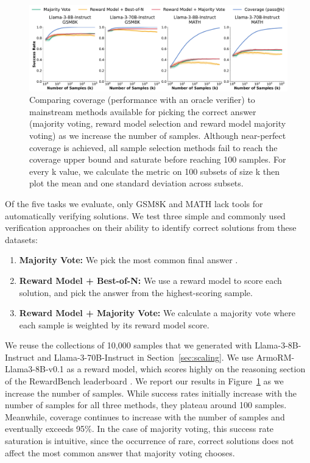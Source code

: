 \documentclass[11pt]{article}
\begin{document}
\begin{figure}
    \centering
    \includegraphics[width=\textwidth]{figures/pass_ats.pdf}
    \caption{Comparing coverage (performance with an oracle verifier) to mainstream methods available for picking the correct answer (majority voting, reward model selection and reward model majority voting) as we increase the number of samples. Although near-perfect coverage is achieved, all sample selection methods fail to reach the coverage upper bound and saturate before reaching 100 samples. For every k value, we calculate the metric on 100 subsets of size k then plot the mean and one standard deviation across subsets.}
    \label{fig:precision_methods}
\end{figure}


Of the five tasks we evaluate, only GSM8K and MATH lack tools for automatically verifying solutions. We test three simple and commonly used verification approaches on their ability to identify correct solutions from these datasets:

\begin{enumerate}
    \item \textbf{Majority Vote:} We pick the most common final answer \cite{wang2023selfconsistency}.
    \item \textbf{Reward Model + Best-of-N:} We use a reward model \cite{christiano2017deepreinforcementlearninghuman} to score each solution, and pick the answer from the highest-scoring sample.  
    \item \textbf{Reward Model + Majority Vote:} We calculate a majority vote where each sample is weighted by its reward model score.
\end{enumerate}

We reuse the collections of 10,000 samples that we generated with Llama-3-8B-Instruct and Llama-3-70B-Instruct in Section~\ref{sec:scaling}. We use ArmoRM-Llama3-8B-v0.1 \citep{ArmoR} as a reward model, which scores highly on the reasoning section of the RewardBench leaderboard \citep{lambert2024rewardbenchevaluatingrewardmodels}. We report our results in Figure~\ref{fig:precision_methods} as we increase the number of samples. While success rates initially increase with the number of samples for all three methods, they plateau around 100 samples. Meanwhile, coverage continues to increase with the number of samples and eventually exceeds 95\%. In the case of majority voting, this success rate saturation is intuitive, since the occurrence of rare, correct solutions does not affect the most common answer that majority voting chooses.
\end{document}
